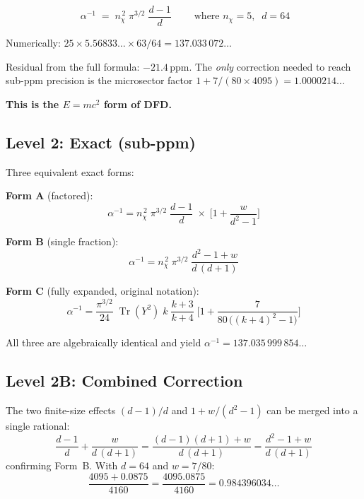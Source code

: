 \documentclass[11pt]{article}
\newcommand{\Tr}{\operatorname{Tr}}
\newcommand{\nchi}{n_{\!\chi}}
\begin{document}
\begin{equation}
\boxed{\;
\alpha^{-1} \;=\; \nchi^{\,2}\;\pi^{3/2}\;\frac{d-1}{d}
\;}
\qquad\text{where } \nchi = 5,\;\; d = 64
\label{eq:emc2}
\end{equation}

\noindent
Numerically: $25 \times 5.56833\ldots \times 63/64 = 137.033\,072\ldots$

\noindent
Residual from the full formula: $-21.4$\,ppm.  The \emph{only} correction needed
to reach sub-ppm precision is the microsector factor
$1 + 7/(80 \times 4095) = 1.0000214\ldots$

\medskip\noindent
\textbf{This is the $E = mc^2$ form of DFD.}

\subsection{Level 2: Exact (sub-ppm)}

Three equivalent exact forms:

\medskip
\noindent\textbf{Form A} (factored):
\begin{equation}
\alpha^{-1} = \nchi^{\,2}\;\pi^{3/2}\;\frac{d-1}{d}
\;\times\;
\biggl[1 + \frac{w}{d^2 - 1}\biggr]
\label{eq:formA}
\end{equation}

\noindent\textbf{Form B} (single fraction):
\begin{equation}
\alpha^{-1} = \nchi^{\,2}\;\pi^{3/2}\;
\frac{d^2 - 1 + w}{d\,(d+1)}
\label{eq:formB}
\end{equation}

\noindent\textbf{Form C} (fully expanded, original notation):
\begin{equation}
\alpha^{-1} = \frac{\pi^{3/2}}{24}\;\Tr(Y^2)\;k\;\frac{k+3}{k+4}\;
\biggl[1 + \frac{7}{80\,\bigl((k{+}4)^2-1\bigr)}\biggr]
\label{eq:formC}
\end{equation}

\noindent
All three are algebraically identical and yield
$\alpha^{-1} = 137.035\,999\,854\ldots$

\subsection{Level 2B: Combined Correction}

The two finite-size effects $(d{-}1)/d$ and $1 + w/(d^2{-}1)$ can be
merged into a single rational:
\begin{equation}
\frac{d-1}{d} + \frac{w}{d\,(d+1)}
= \frac{(d-1)(d+1) + w}{d\,(d+1)}
= \frac{d^2 - 1 + w}{d\,(d+1)}
\label{eq:combined}
\end{equation}
confirming Form~B.  With $d = 64$ and $w = 7/80$:
\[
\frac{4095 + 0.0875}{4160} = \frac{4095.0875}{4160} = 0.984396034\ldots
\]
\end{document}

